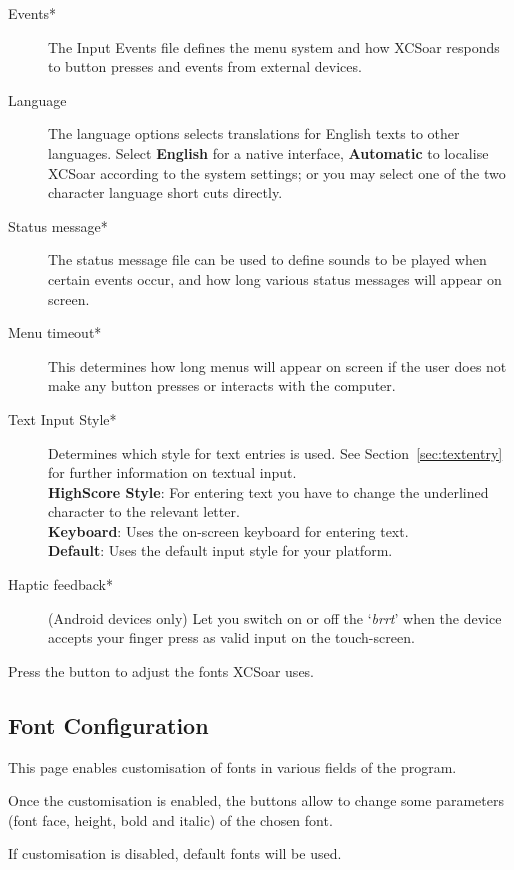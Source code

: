\begin{description}
\item[Events*]  The Input Events file defines the menu system and how XCSoar
  responds to button presses and events from external devices.
\item[Language]  The language options selects translations for English texts to
  other languages.  Select {\bf English} for a native interface, {\bf Automatic}
  to localise XCSoar according to the system settings; or you may select one of 
  the two character language short cuts directly.
\item[Status message*]  The status message file can be used to define sounds to 
  be played when certain events occur, and how long various status messages will 
  appear on screen.
\item[Menu timeout*]  This determines how long menus will appear on screen if the user
  does not make any button presses or interacts with the computer.
\item[Text Input Style*]  Determines which style for text entries is used. 
  See Section~\ref{sec:textentry} for further information on textual input. \\
  {\bf HighScore Style}: For entering text you have to change the underlined 
  character to the relevant letter. \\
  {\bf Keyboard}: Uses the on-screen keyboard for entering text. \\
  {\bf Default}: Uses the default input style for your platform.
\item[Haptic feedback*]  (Android devices only) Let you switch on or off the `{\it brrt}' 
  when the device accepts your finger press as valid input on the touch-screen.
\end{description}

Press the  button to adjust the fonts XCSoar uses.

\subsection*{Font Configuration}

This page enables customisation of fonts in various fields of the program.


Once the customisation is enabled, the  buttons allow to change 
some parameters (font face, height, bold and italic) of the chosen font.

If customisation is disabled, default fonts will be used.


